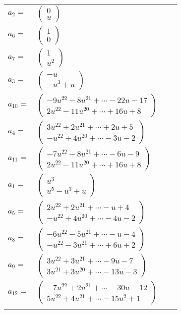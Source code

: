\documentclass[1p]{elsarticle_modified}
\theoremstyle{definition}
\begin{document}
\begin{tabular}{m{7pt} m{180pt} m{7pt} m{180pt} }
\flushright $a_{2}=$&$\begin{pmatrix}0\\u\end{pmatrix}$ \\
\flushright $a_{6}=$&$\begin{pmatrix}1\\0\end{pmatrix}$ \\
\flushright $a_{7}=$&$\begin{pmatrix}1\\u^2\end{pmatrix}$ \\
\flushright $a_{3}=$&$\begin{pmatrix}- u\\- u^3+u\end{pmatrix}$ \\
\flushright $a_{10}=$&$\begin{pmatrix}-9 u^{22}-8 u^{21}+\cdots-22 u-17\\2 u^{22}-11 u^{20}+\cdots+16 u+8\end{pmatrix}$ \\
\flushright $a_{4}=$&$\begin{pmatrix}3 u^{22}+2 u^{21}+\cdots+2 u+5\\- u^{22}+4 u^{20}+\cdots-3 u-2\end{pmatrix}$ \\
\flushright $a_{11}=$&$\begin{pmatrix}-7 u^{22}-8 u^{21}+\cdots-6 u-9\\2 u^{22}-11 u^{20}+\cdots+16 u+8\end{pmatrix}$ \\
\flushright $a_{1}=$&$\begin{pmatrix}u^3\\u^5- u^3+u\end{pmatrix}$ \\
\flushright $a_{5}=$&$\begin{pmatrix}2 u^{22}+2 u^{21}+\cdots- u+4\\- u^{22}+4 u^{20}+\cdots-4 u-2\end{pmatrix}$ \\
\flushright $a_{8}=$&$\begin{pmatrix}-6 u^{22}-5 u^{21}+\cdots- u-4\\- u^{22}-3 u^{21}+\cdots+6 u+2\end{pmatrix}$ \\
\flushright $a_{9}=$&$\begin{pmatrix}3 u^{22}+3 u^{21}+\cdots-9 u-7\\3 u^{21}+3 u^{20}+\cdots-13 u-3\end{pmatrix}$ \\
\flushright $a_{12}=$&$\begin{pmatrix}-7 u^{22}+2 u^{21}+\cdots-30 u-12\\5 u^{22}+4 u^{21}+\cdots-15 u^2+1\end{pmatrix}$\\&\end{tabular}
\end{document}
